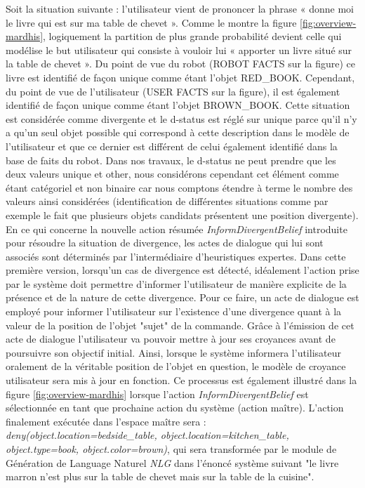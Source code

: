 \documentclass[a4paper,11pt,twoside]{StyleThese}
\begin{document}
Soit la situation suivante :
l’utilisateur vient de prononcer la phrase « donne moi le livre qui est sur ma table de
chevet ». Comme le montre la figure \ref{fig:overview-mardhis}, logiquement la partition de plus grande probabilité devient celle qui modélise le but utilisateur qui consiste à vouloir lui « apporter
un livre situé sur la table de chevet ». Du point de vue du robot (ROBOT FACTS sur
la figure) ce livre est identifié de façon unique comme étant l’objet RED\_BOOK. Cependant,
du point de vue de l’utilisateur (USER FACTS sur la figure), il est également identifié
de façon unique comme étant l’objet BROWN\_BOOK. Cette situation est considérée
comme divergente et le d-status est réglé sur unique parce qu’il n’y a qu’un seul objet possible qui correspond à cette description dans le modèle de l’utilisateur et que ce dernier est différent de celui également identifié dans la base de faits  du robot. Dans nos travaux, le d-status ne peut prendre que les deux valeurs unique et
other, nous considérons cependant cet élément comme étant catégoriel et non binaire
car nous comptons étendre à terme le nombre des valeurs ainsi considérées (identification de différentes situations comme par exemple le fait que plusieurs objets candidats
présentent une position divergente).
En ce qui concerne la nouvelle action résumée \textit{InformDivergentBelief} introduite pour
résoudre la situation de divergence, les actes de dialogue qui lui sont associés sont déterminés par l’intermédiaire d’heuristiques expertes. Dans cette
première version, lorsqu’un cas de divergence est détecté, idéalement l’action prise par le système doit permettre d’informer l’utilisateur de manière explicite de la présence et de la nature de cette divergence.
Pour ce faire, un acte de dialogue est employé pour informer l’utilisateur sur l’existence d’une divergence quant à la valeur de la position de l’objet "sujet"
de la commande. Grâce à l’émission de cet acte de dialogue l’utilisateur va pouvoir
mettre à jour ses croyances avant de poursuivre son objectif initial. Ainsi, lorsque le
système informera l’utilisateur oralement de la véritable position de l’objet en question, le modèle de croyance utilisateur sera mis à jour en fonction. Ce processus est également illustré dans la figure \ref{fig:overview-mardhis} lorsque l’action \textit{InformDivergentBelief} est sélectionnée
en tant que prochaine action du système (action maître). L’action finalement exécutée
dans l’espace maître sera : \textit{deny(object.location=bedside\_table, object.location=kitchen\_table,
object.type=book, object.color=brown)}, qui sera transformée par le module de Génération de Language Naturel \textit{NLG} dans l’énoncé système suivant "le livre marron n’est plus sur la table de chevet mais sur la table de la cuisine".
\end{document}
